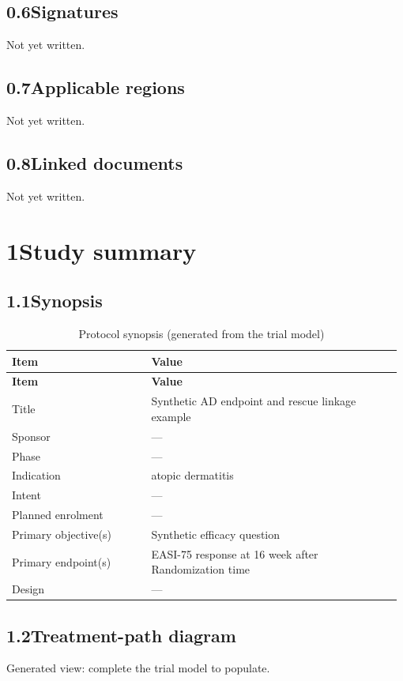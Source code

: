 \documentclass[11pt,a4paper]{article}
\newcommand{\psnote}[2]{\par\noindent\colorbox{#1!8}{\parbox{\dimexpr\linewidth-2\fboxsep}{\small\color{#1}#2}}\par}
\begin{document}
\subsection{0.6\quad Signatures}\label{section.0.6}
\psnote{pswarn}{Not yet written.}
\subsection{0.7\quad Applicable regions}\label{section.0.7}
\psnote{pswarn}{Not yet written.}
\subsection{0.8\quad Linked documents}\label{section.0.8}
\psnote{pswarn}{Not yet written.}
\section{1\quad Study summary}\label{section.1}
\subsection{1.1\quad Synopsis}\label{section.1.1}
\begin{longtable}{@{}>{\RaggedRight}p{0.35\linewidth}>{\RaggedRight}p{0.63\linewidth}@{}}
\caption{Protocol synopsis (generated from the trial model)}\\ \toprule
\textbf{\small Item} & \textbf{\small Value} \\ \midrule\endfirsthead
\textbf{\small Item} & \textbf{\small Value} \\ \midrule\endhead
\small Title & \small Synthetic AD endpoint and rescue linkage example \\
\small Sponsor & \small --- \\
\small Phase & \small --- \\
\small Indication & \small atopic dermatitis \\
\small Intent & \small --- \\
\small Planned enrolment & \small --- \\
\small Primary objective(s) & \small Synthetic efficacy question \\
\small Primary endpoint(s) & \small EASI-75 response at 16 week after Randomization time \\
\small Design & \small --- \\
\bottomrule
\end{longtable}
\subsection{1.2\quad Treatment-path diagram}\label{section.1.2}
\psnote{pswarn}{Generated view: complete the trial model to populate.}
\end{document}
